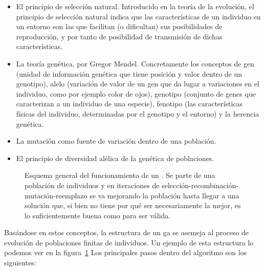 \begin{itemize}
	\item El principio de selección natural. Introducido en la teoría de la evolución, el principio de selección natural indica que las características de un individuo en un entorno son las que facilitan (o dificultan) sus posibilidades de reproducción, y por tanto de posibilidad de transmisión de dichas características.
	\item La teoría genética, por Gregor Mendel. Concretamente los conceptos de gen (unidad de información genética que tiene posición y valor dentro de un genotipo), alelo (variación de valor de un gen que da lugar a variaciones en el individuo, como por ejemplo color de ojos), genotipo (conjunto de genes que caracterizan a un individuo de una especie), fenotipo (las características físicas del individuo, determinadas por el genotipo y el entorno) y la herencia genética.
	\item La mutación como fuente de variación dentro de una población.
	\item El principio de diversidad alélica de la genética de poblaciones.
\end{itemize}

\begin{figure}
	\caption{Esquema general del funcionamiento de un . Se parte de una población de individuos y en iteraciones de selección-recombinación-mutación-reemplazo se va mejorando la población hasta llegar a una solución que, si bien no tiene por qué ser necesariamente la mejor, es lo suficientemente buena como para ser válida.}
	\label{fig:genetic-algorithm-schema}
\end{figure}

Basándose en estos conceptos, la estructura de un \gls{ga} se asemeja al proceso de evolución de poblaciones finitas de individuos. Un ejemplo de esta estructura lo podemos ver en la figura~\ref{fig:genetic-algorithm-schema} Los principales pasos dentro del algoritmo son los siguientes:


